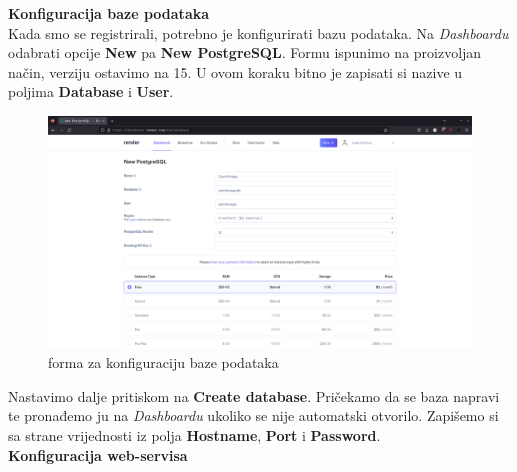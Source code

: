 			 
			 \textbf{Konfiguracija baze podataka}\\
			 
			 
			Kada smo se registrirali, potrebno je konfigurirati bazu podataka. Na \textit{Dashboardu} odabrati opcije \textbf{New} pa \textbf{New PostgreSQL}. Formu ispunimo na proizvoljan način, verziju ostavimo na 15. U ovom koraku bitno je zapisati si nazive u poljima \textbf{Database} i \textbf{User}. 
			\begin{figure}[H]
			\includegraphics[width=\textwidth]{slike/konfigdb.png} %
			\caption{forma za konfiguraciju baze podataka}
			\label{fig:konfigdb} %
			\end{figure}
			Nastavimo dalje pritiskom na \textbf{Create database}.
			Pričekamo da se baza napravi te pronađemo ju na \textit{Dashboardu} ukoliko se nije automatski otvorilo. Zapišemo si sa strane vrijednosti iz polja \textbf{Hostname}, \textbf{Port} i \textbf{Password}.\\
			
			
			\textbf{Konfiguracija web-servisa}\\
			
